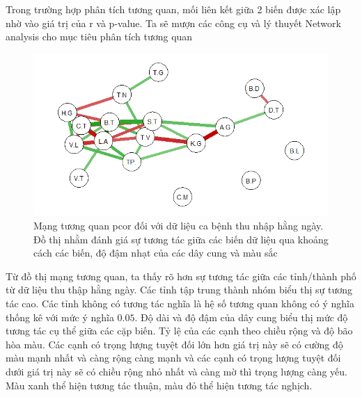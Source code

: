 \documentclass[../thesis.tex]{subfiles}
\begin{document}
\newpage

Trong trường hợp phân tích tương quan, mối liên kết giữa 2 biến được xác lập nhờ vào giá trị của r và p-value. Ta sẽ mượn các công cụ và lý thuyết Network analysis cho mục tiêu phân tích tương quan
  \begin{Shaded}
	\begin{Highlighting}[]
\OtherTok{\textless{}{-}}\SpecialCharTok{\%\textgreater{}\%} \NormalTok{() }\SpecialCharTok{\%\textgreater{}\%} 
\SpecialCharTok{::}
		 \NormalTok{, }
		 \NormalTok{, }
		 \NormalTok{,}
		 
		 \NormalTok{)}
	\end{Highlighting}
\end{Shaded}

\begin{figure}[H]
	\centering
	\includegraphics[width=0.7\linewidth]{images/net_case_05}
	\caption[Mạng tương quan pcor đối với dữ liệu ca bệnh thu nhập hằng ngày]{Mạng tương quan pcor đối với dữ liệu ca bệnh thu nhập hằng ngày. Đồ thị nhằm đánh giá sự tương tác giữa các biến dữ liệu qua khoảng cách các biến, độ đậm nhạt của các dây cung và màu sắc}
	\label{fig:netcase05}
\end{figure}

Từ đồ thị mạng tương quan, ta thấy rõ hơn sự tương tác giữa các tỉnh/thành phố từ dữ liệu thu thập hằng ngày. Các tỉnh tập trung thành nhóm biểu thị sự tương tác cao. Các tỉnh không có tương tác nghĩa là hệ số tương quan không có ý nghĩa thống kê với mức ý nghĩa $ 0.05 $. Độ dài và độ đậm của dây cung biểu thị mức độ tương tác cụ thể giữa các cặp biến. Tỷ lệ của các cạnh theo chiều rộng và độ bão hòa màu. Các cạnh có trọng lượng tuyệt đối lớn hơn giá trị này sẽ có cường độ màu mạnh nhất và càng rộng càng mạnh và các cạnh có trọng lượng tuyệt đối dưới giá trị này sẽ có chiều rộng nhỏ nhất và càng mờ thì trọng lượng càng yếu. Màu xanh thể hiện tương tác thuận, màu đỏ thể hiện tương tác nghịch.
\end{document}
